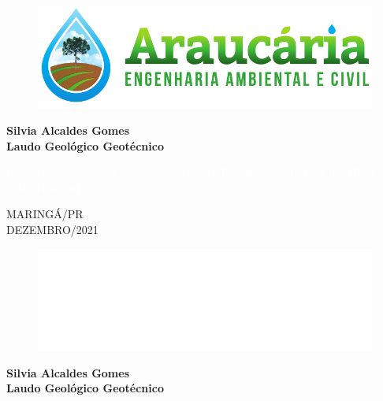 \thispagestyle{empty}
\chead{}
\begin{figure}[t!]
\centering
\includegraphics[width = 7 cm]{./imagens/logo.pdf}
\end{figure}
\mbox{}
 
\vspace{6.5cm}

\begin{center}
{\Large \bfseries
Silvia Alcaldes Gomes\\
Laudo Geológico Geotécnico
}
\end{center}
\mbox{}

\vfill

\begin{flushright}
\begin{minipage}[h]{8cm}
{\footnotesize \textcolor{white}{Relatório de sondagem geológica do tipo SPT, conforme diretrizes da ABNT NBR 6484:2001}}
\end{minipage}
\end{flushright}

\vfill

\begin{center}
{\large
{MARINGÁ/PR\\
DEZEMBRO/2021}
}
\end{center}
\newpage

\thispagestyle{empty}
\begin{figure}[t!]
\centering
\includegraphics[width = 7 cm]{./imagens/logo2.pdf}
\end{figure}
\mbox{}
 
\vspace{6.5cm}
\begin{center}
{\Large \bfseries
Silvia Alcaldes Gomes\\
Laudo Geológico Geotécnico
}
\end{center}

